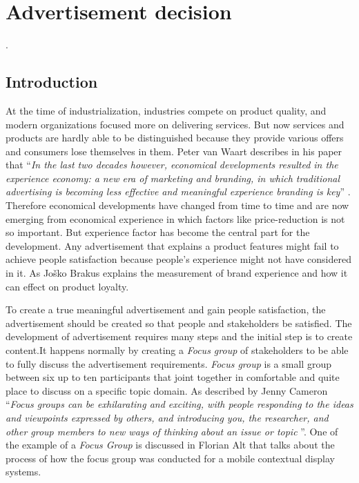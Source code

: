 \chapter{Advertisement decision} %

\label{Chapter4} %
\newpage
.
\newpage



\section{Introduction}
At the time of industrialization, industries compete on product quality, and modern organizations focused more on delivering services. But now services and products are hardly able to be distinguished because they provide various offers and consumers lose themselves in them. Peter van Waart describes in his paper that ``\emph{In the last two decades however, economical developments resulted in the experience economy: a new era of marketing and branding, in which traditional advertising is becoming less effective and meaningful experience branding is key}'' \cite{Meaningful_ad}.  Therefore economical developments have changed from time to time and are now emerging from economical experience in which factors like price-reduction is not so important. But experience factor has become the central part for the development. Any advertisement that explains a product features might fail to achieve people satisfaction because people’s experience might not have considered in it. As Joško Brakus \cite{Brand_experience} explains the measurement of brand experience and how it can effect on product loyalty.

To create a true meaningful advertisement and gain people satisfaction, the advertisement should be created so that people and stakeholders be satisfied.
The development of advertisement requires many steps and the initial step is to create content.It happens normally by creating a \emph{Focus group} of stakeholders to be able to fully discuss the advertisement requirements. \emph{Focus group} is a small group between six up to ten participants that joint together in comfortable and quite place to discuss on a specific topic domain. As described by Jenny Cameron ``\emph{Focus groups can be exhilarating and exciting, with people responding to the ideas and viewpoints expressed by others, and introducing you, the researcher, and other group members to new ways of thinking about an issue or topic }''\cite{FocusGroup}. One of the example of a \emph{Focus Group} is discussed in Florian Alt \cite{mobile_focus_group} that talks about the process of how the focus group was conducted for a mobile contextual display systems.

